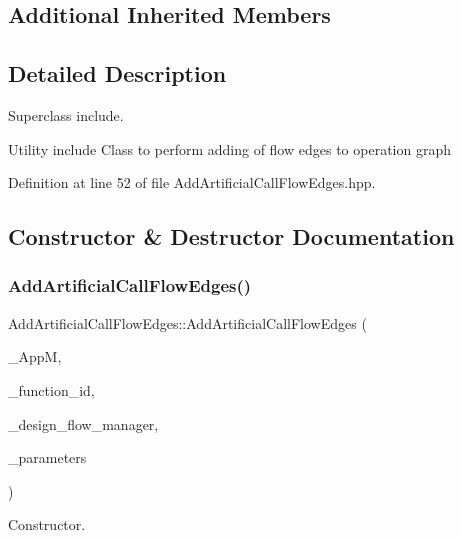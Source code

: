 \subsection*{Additional Inherited Members}


\subsection{Detailed Description}
Superclass include. 

Utility include Class to perform adding of flow edges to operation graph 

Definition at line 52 of file Add\+Artificial\+Call\+Flow\+Edges.\+hpp.



\subsection{Constructor \& Destructor Documentation}
\mbox{\label{classAddArtificialCallFlowEdges_ad15a28de47a0eec6a6fc3b4e4659d50b}} 
\subsubsection{\texorpdfstring{Add\+Artificial\+Call\+Flow\+Edges()}{AddArtificialCallFlowEdges()}}
{\footnotesize\ttfamily Add\+Artificial\+Call\+Flow\+Edges\+::\+Add\+Artificial\+Call\+Flow\+Edges (\begin{DoxyParamCaption}\item[{const \hyperlink{application__manager_8hpp_a04ccad4e5ee401e8934306672082c180}{application\+\_\+manager\+Ref}}]{\+\_\+\+AppM,  }\item[{unsigned int}]{\+\_\+function\+\_\+id,  }\item[{const Design\+Flow\+Manager\+Const\+Ref}]{\+\_\+design\+\_\+flow\+\_\+manager,  }\item[{const \hyperlink{Parameter_8hpp_a37841774a6fcb479b597fdf8955eb4ea}{Parameter\+Const\+Ref}}]{\+\_\+parameters }\end{DoxyParamCaption})}



Constructor. 

